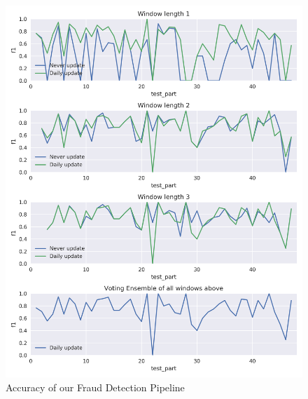 \begin{figure}
\centering
\includegraphics[width=\textwidth]{Images/ensemble.png}
\caption{Accuracy of our Fraud Detection Pipeline}
\label{img:fdp_summary}
\end{figure}




